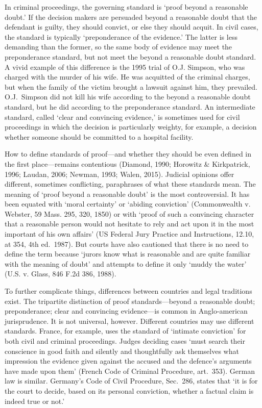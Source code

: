 \documentclass[10pt,dvipsnames,enabledeprecatedfontcommands]{scrartcl}
\begin{document}
In criminal proceedings, the governing standard is `proof beyond a
reasonable doubt.' If the decision makers are persuaded beyond a
reasonable doubt that the defendant is guilty, they should convict, or
else they should acquit. In civil cases, the standard is typically
`preponderance of the evidence.' The latter is less demanding than the
former, so the same body of evidence may meet the preponderance
standard, but not meet the beyond a reasonable doubt standard. A vivid
example of this difference is the 1995 trial of O.J. Simpson, who was
charged with the murder of his wife. He was acquitted of the criminal
charges, but when the family of the victim brought a lawsuit against
him, they prevailed. O.J.~Simpson did not kill his wife according to the
beyond a reasonable doubt standard, but he did according to the
preponderance standard. An intermediate standard, called `clear and
convincing evidence,' is sometimes used for civil proceedings in which
the decision is particularly weighty, for example, a decision whether
someone should be committed to a hospital facility.

How to define standards of proof---and whether they should be even
defined in the first place---remains contentious (Diamond, 1990;
Horowitz \& Kirkpatrick, 1996; Laudan, 2006; Newman, 1993; Walen, 2015).
Judicial opinions offer different, sometimes conflicting, paraphrases of
what these standards mean. The meaning of `proof beyond a reasonable
doubt' is the most controversial. It has been equated with `moral
certainty' or `abiding conviction' (Commonwealth v. Webster, 59 Mass.
295, 320, 1850) or with `proof of such a convincing character that a
reasonable person would not hesitate to rely and act upon it in the most
important of his own affairs' (US Federal Jury Practice and
Instructions, 12.10, at 354, 4th ed.~1987). But courts have also
cautioned that there is no need to define the term because `jurors know
what is reasonable and are quite familiar with the meaning of doubt' and
attempts to define it only `muddy the water' (U.S. v. Glass, 846 F.2d
386, 1988).

To further complicate things, differences between countries and legal
traditions exist. The tripartite distinction of proof standards---beyond
a reasonable doubt; preponderance; clear and convincing evidence---is
common in Anglo-american jurisprudence. It is not universal, however.
Different countries may use different standards. France, for example,
uses the standard of `intimate conviction' for both civil and criminal
proceedings. Judges deciding cases `must search their conscience in good
faith and silently and thoughtfully ask themselves what impression the
evidence given against the accused and the defence's arguments have made
upon them' (French Code of Criminal Procedure, art.~353). German law is
similar. Germany's Code of Civil Procedure, Sec.~286, states that `it is
for the court to decide, based on its personal conviction, whether a
factual claim is indeed true or
not.'
\end{document}
